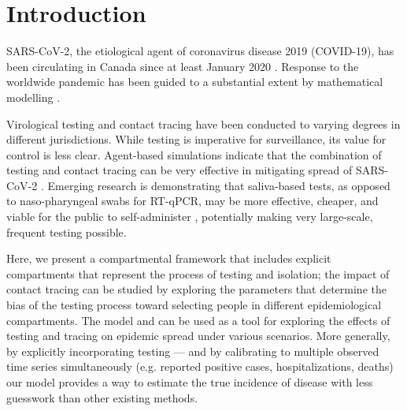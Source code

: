 \documentclass[12pt]{article}\usepackage[]{graphicx}\usepackage[]{color}
\begin{document}

\tableofcontents




\section{Introduction}

SARS-CoV-2, the
etiological agent of coronavirus disease 2019 (COVID-19), has been
circulating in Canada since at least January 2020 \cite{onpr_200125}.
Response to the worldwide pandemic \cite{Li+20,Fauc+20} has been
guided to a substantial extent by mathematical modelling
\cite{Flax+20}.


Virological testing and contact tracing have been conducted to varying
degrees in different jurisdictions.  While testing is
imperative for surveillance, its value for control is less clear.
Agent-based simulations indicate that the combination of testing and
contact tracing can be very effective in mitigating spread of
SARS-CoV-2 \cite{Ng+20}.  Emerging research is demonstrating that
saliva-based tests, as opposed to naso-pharyngeal swabs for RT-qPCR,
may be more effective, cheaper, and viable for the public to
self-administer \cite{Will+20,Wyll+20}, potentially making very
large-scale, frequent testing possible.

Here, we present a compartmental framework that includes explicit
compartments that represent the process of testing and
isolation; the impact of contact tracing can be studied
by exploring the parameters that determine the bias of the
testing process toward selecting people in different epidemiological compartments.
The model and can be used as a tool for exploring the effects of
testing and tracing on epidemic spread under various scenarios.
More generally, by explicitly incorporating testing --- and by calibrating
to multiple observed time series simultaneously (e.g. reported positive cases,
hospitalizations, deaths) our model provides a way to estimate the true
incidence of disease with less guesswork than other existing methods.
\end{document}
